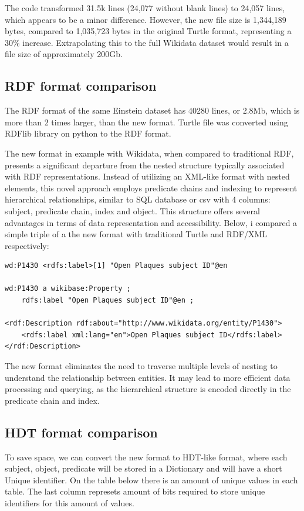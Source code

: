 The code transformed 31.5k lines (24,077 without blank lines) to 24,057 lines, which appears to be a minor difference. However, the new file size is 1,344,189 bytes, compared to 1,035,723 bytes in the original Turtle format, representing a 30\% increase. Extrapolating this to the full Wikidata dataset would result in a file size of approximately 200Gb.


\subsection{RDF format comparison}
The RDF format of the same Einstein dataset has 40280 lines, or 2.8Mb, which is more than 2 times larger, than the new format. Turtle file was converted using RDFlib library on python to the RDF format.

The new format in example with Wikidata, when compared to traditional RDF, presents a significant departure from the nested structure typically associated with RDF representations. Instead of utilizing an XML-like format with nested elements, this novel approach employs predicate chains and indexing to represent hierarchical relationships, similar to SQL database or csv with 4 columns: subject, predicate chain, index and object. This structure offers several advantages in terms of data representation and accessibility. Below, i compared a simple triple of a the new format with traditional Turtle and RDF/XML respectively:

{\footnotesize
\begin{verbatim}
wd:P1430 <rdfs:label>[1] "Open Plaques subject ID"@en

wd:P1430 a wikibase:Property ;
    rdfs:label "Open Plaques subject ID"@en ;

<rdf:Description rdf:about="http://www.wikidata.org/entity/P1430">
    <rdfs:label xml:lang="en">Open Plaques subject ID</rdfs:label>
</rdf:Description>
\end{verbatim}
}

The new format eliminates the need to traverse multiple levels of nesting to understand the relationship between entities. It may lead to more efficient data processing and querying, as the hierarchical structure is encoded directly in the predicate chain and index.

\subsection{HDT format comparison}
To save space, we can convert the new format to HDT-like format, where each subject, object, predicate will be stored in a Dictionary and will have a short Unique identifier. On the table below there is an amount of unique values in each table. The last column represets amount of bits required to store unique identifiers for this amount of values.

